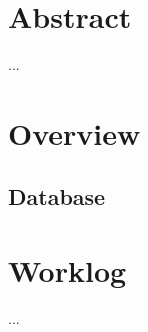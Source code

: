 \documentclass[12pt]{article}
\begin{document}


\tableofcontents

\section{Abstract}
...

\section{Overview}
\subsection{Database}


\section{Worklog}


...
\end{document}

